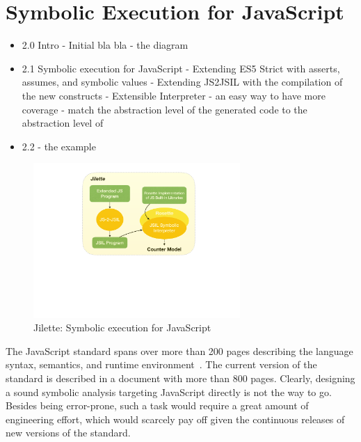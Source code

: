 \section{Symbolic Execution for JavaScript}
\label{sec:sym:exec:js}

\begin{itemize}
   \item 2.0 Intro - Initial bla bla - the diagram 
   \item 2.1 Symbolic execution for JavaScript 
              - Extending ES5 Strict with asserts, assumes, and symbolic values
              - Extending JS2JSIL with the compilation of the new constructs 
              - Extensible Interpreter 
                   - an easy way to have more coverage 
                   - match the abstraction level of the generated code to the abstraction level of \rosette 
    \item 2.2 - the example 
\end{itemize}

\begin{figure}[t]
\centering
\includegraphics[width=0.7\textwidth]{figures/jilette.pdf}
\caption{Jilette: Symbolic execution for JavaScript}
\label{fig:jilette:diagram}
\end{figure}

The JavaScript standard spans over more than 200 pages describing the language syntax, semantics, 
and runtime environment~\cite{ecma}. The current version of the standard is described in a document with 
more than 800 pages. Clearly, designing a sound symbolic analysis targeting JavaScript directly 
is not the way to go. Besides being error-prone, such a task would require a great amount of engineering effort, 
which would scarcely pay off given the continuous releases of new versions of the standard. 


